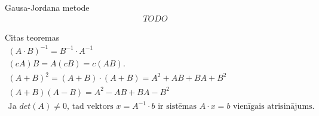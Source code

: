\documentclass[12pt]{article}
\begin{document}
Gausa-Jordana metode
\begin{gather*}
	TODO
\end{gather*}


\pagebreak

Citas teoremas
\begin{gather*}
	(A \cdot B)^{-1} = B^{-1} \cdot A^{-1} \\
	(cA)B = A(cB) = c(AB). \\ %
	(A+B)^2 =(A+B)\cdot (A+B)= A^2 +AB+BA+B^2 \\
	(A+B)(A-B)=A^2-AB+BA-B^2 \\
	\text{Ja $det(A) \neq 0$, tad vektors $x=A^{-1} \cdot b$ ir sistēmas $A \cdot x = b$ vienīgais atrisinājums.}
\end{gather*}

 \\


\begin{gather*}
\end{gather*}

\begin{comment}
\end{comment}
\end{document}
